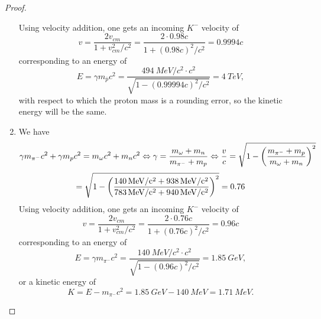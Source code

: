 \documentclass{article}
\begin{document}
\begin{proof}
\begin{enumerate}
\[    \]
    Using velocity addition, one gets an incoming $K^{-}$ velocity of
    \[
      v = \frac{2v_{cm}}{1 + v_{cm}^{2}/c^{2}} = \frac{2 \cdot 0.98c}{1 + (0.98c)^{2}/c^{2}} = 0.9994c
    \]
    corresponding to an energy of
    \[
      E = \gamma m_{\bar{p}}c^{2} = \frac{\SI{494}{MeV/c^{2}} \cdot c^{2}}{\sqrt{1 - (0.99994c)^{2}/c^{2}}}
      = \SI{4}{TeV},
    \]
    with respect to which the proton mass is a rounding error, so the kinetic energy will be the same.
  \item We have
    \[
      \gamma m_{\pi^{-}}c^{2} + \gamma m_{p}c^{2} = m_{\omega}c^{2} + m_{n}c^{2}
      \Leftrightarrow \gamma = \frac{m_{\omega} + m_{n}}{m_{\pi^{-}} + m_{p}}
      \Leftrightarrow \frac{v}{c} = \sqrt{1 - \qty(\frac{m_{\pi^{-}} + m_{p}}{m_{\omega} + m_{n}})^{2}}
    \]
    \[
      = \sqrt{1 - \qty(\frac{\SI{140}{MeV/c^{2}} + \SI{938}{MeV/c^{2}}}{\SI{783}{MeV/c^{2}} + \SI{940}{MeV/c^{2}}})^{2}}
      = 0.76
    \]
    Using velocity addition, one gets an incoming $K^{-}$ velocity of
    \[
      v = \frac{2v_{cm}}{1 + v_{cm}^{2}/c^{2}} = \frac{2 \cdot 0.76c}{1 + (0.76c)^{2}/c^{2}} = 0.96c
    \]
    corresponding to an energy of
    \[
      E = \gamma m_{\pi^{-}}c^{2} = \frac{\SI{140}{MeV/c^{2}} \cdot c^{2}}{\sqrt{1 - (0.96c)^{2}/c^{2}}}
      = \SI{1.85}{GeV},
    \]
    or a kinetic energy of
    \[
      K = E - m_{\pi^{-}}c^{2} = \SI{1.85}{GeV} - \SI{140}{MeV} = \SI{1.71}{MeV}.
    \]
  \end{enumerate}
\end{proof}
\end{document}
